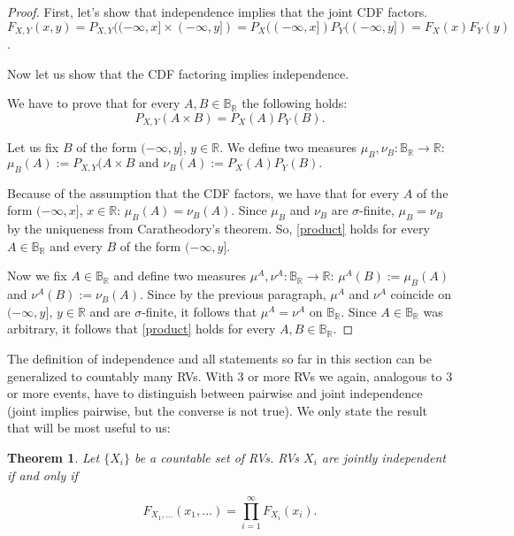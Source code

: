 \documentclass{book}
\theoremstyle{plain}%
\newtheorem{theorem}{Theorem}[section]
\theoremstyle{definition}
\newlength{\arrow}
\begin{document}
\begin{proof}
First, let's show that independence implies that the joint CDF factors. $F_{X,Y}(x,y) = P_{X,Y}((-\infty,x] \times (-\infty,y]) = P_X((-\infty,x])P_Y((-\infty,y]) = F_X(x)F_Y(y)$.

Now let us show that the CDF factoring implies independence.

We have to prove that for every $A,B \in \mathbb{B}_\mathbb{R}$ the following holds: 
\begin{equation}
	\label{product}
		P_{X,Y} (A\times B)=P_X(A)P_Y(B).
\end{equation}


Let us fix $B$ of the form $(-\infty, y]$, $y \in \mathbb{R}$. We define two measures 
$\mu_B,\nu_B :\mathbb{B}_\mathbb{R} \rightarrow \mathbb{R}$: $\mu_B(A) := P_{X,Y}(A \times B \text{ and }\nu_B(A) := P_X(A)P_Y(B).$

Because of the assumption that the CDF factors, we have that for every $A$ of the form $(-\infty, x]$, $x \in \mathbb{R}$: 
$\mu_B(A) = \nu_B(A)$.
Since $\mu_B$ and $\nu_B$ are $\sigma$-finite, $\mu_B = \nu_B$ by the uniqueness from Caratheodory's theorem. So, 
\eqref{product} holds 
for every $A \in \mathbb{B}_\mathbb{R}$ and every $B$ of the form $(-\infty, y]$.

Now we fix $A\in \mathbb{B}_\mathbb{R}$ and define two measures $\mu^A,\nu^A:\mathbb{B}_\mathbb{R} \rightarrow \mathbb{R}$: $\mu^A(B):=\mu_B(A)$ and $\nu^A(B):=\nu_B(A)$. Since by the previous paragraph, $\mu^A$ and $\nu^A$ coincide on $(-\infty, y]$, $y \in \mathbb{R}$ and are $\sigma$-finite, it follows that $\mu^A = \nu^A$ on $\mathbb{B}_\mathbb{R}$. Since $A\in \mathbb{B}_\mathbb{R}$ was arbitrary, it follows that \eqref{product} holds for every $A,B \in \mathbb{B}_\mathbb{R}$.

\end{proof}

The definition of independence and all statements so far in this section can be generalized to countably many RVs. With 3 or more RVs we again, analogous to 3 or more events, have to distinguish between pairwise and joint independence (joint implies pairwise, but the converse is not true). We only state the result that will be most useful to us:

\begin{theorem}
Let $\{X_i\}$ be a countable set of RVs. RVs $X_i$ are jointly independent if and only if

$$F_{X_1,\dots}(x_1,\dots) = \prod_{i=1}^\infty F_{X_i}(x_i).$$
\end{theorem}
\end{document}
